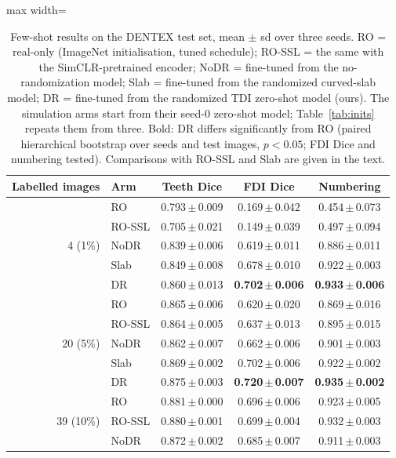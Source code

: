 \documentclass[preprint,12pt]{elsarticle}
\newcommand{\pmsd}[2]{#1\,$\pm$\,#2}
\begin{document}
\begin{table}[t]
\centering\small
\caption{Few-shot results on the DENTEX test set, mean $\pm$ sd over three seeds. RO = real-only (ImageNet
initialisation, tuned schedule); RO-SSL = the same with the SimCLR-pretrained encoder; NoDR = fine-tuned from the
no-randomization model; Slab = fine-tuned from the randomized curved-slab model; DR = fine-tuned from the randomized TDI
zero-shot model (ours). The simulation arms start from their seed-0 zero-shot model; Table~\ref{tab:inits} repeats
them from three. Bold: DR differs significantly from RO (paired hierarchical bootstrap over seeds and test images,
$p < 0.05$; FDI Dice and numbering tested). Comparisons with RO-SSL and Slab are given in the text.}
\label{tab:fewdentex}
\begin{adjustbox}{max width=\linewidth}
\begin{tabular}{@{}rlccc@{}}
\toprule
Labelled images & Arm & Teeth Dice & FDI Dice & Numbering \\
\midrule
\multirow{5}{*}{4 (1\%)} & RO & \pmsd{0.793}{0.009} & \pmsd{0.169}{0.042} & \pmsd{0.454}{0.073} \\
 & RO-SSL & \pmsd{0.705}{0.021} & \pmsd{0.149}{0.039} & \pmsd{0.497}{0.094} \\
 & NoDR & \pmsd{0.839}{0.006} & \pmsd{0.619}{0.011} & \pmsd{0.886}{0.011} \\
 & Slab & \pmsd{0.849}{0.008} & \pmsd{0.678}{0.010} & \pmsd{0.922}{0.003} \\
 & DR & \pmsd{0.860}{0.013} & \textbf{\pmsd{0.702}{0.006}} & \textbf{\pmsd{0.933}{0.006}} \\
\midrule
\multirow{5}{*}{20 (5\%)} & RO & \pmsd{0.865}{0.006} & \pmsd{0.620}{0.020} & \pmsd{0.869}{0.016} \\
 & RO-SSL & \pmsd{0.864}{0.005} & \pmsd{0.637}{0.013} & \pmsd{0.895}{0.015} \\
 & NoDR & \pmsd{0.862}{0.007} & \pmsd{0.662}{0.006} & \pmsd{0.901}{0.003} \\
 & Slab & \pmsd{0.869}{0.002} & \pmsd{0.702}{0.006} & \pmsd{0.922}{0.002} \\
 & DR & \pmsd{0.875}{0.003} & \textbf{\pmsd{0.720}{0.007}} & \textbf{\pmsd{0.935}{0.002}} \\
\midrule
\multirow{5}{*}{39 (10\%)} & RO & \pmsd{0.881}{0.000} & \pmsd{0.696}{0.006} & \pmsd{0.923}{0.005} \\
 & RO-SSL & \pmsd{0.880}{0.001} & \pmsd{0.699}{0.004} & \pmsd{0.932}{0.003} \\
 & NoDR & \pmsd{0.872}{0.002} & \pmsd{0.685}{0.007} & \pmsd{0.911}{0.003} \\

\end{tabular}
\end{adjustbox}
\end{table}
\end{document}
